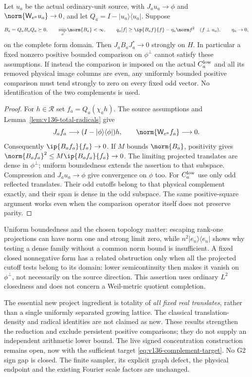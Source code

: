 \begin{proposition}
\label{prop:v136-positive-comparison}
Let $u_a$ be the actual ordinary-unit source, with $J_au_a\to\phi$
and $\norm{\mathsf W_{e^a}u_a}\to0$, and let
$Q_a=I-|u_a\rangle\langle u_a|$. Suppose
\[
 B_a=Q_aB_aQ_a\succeq0,\qquad\sup_a\norm{B_a}<\infty,
 \qquad
 q_a[f]\ge\ip{B_af}{f}-\eta_a\norm f^2\quad(f\perp u_a),
 \qquad\eta_a\to0,
\]
on the complete form domain. Then
$J_aB_aJ_a^*\to0$ strongly on $H$.
In particular a fixed nonzero positive bounded comparison on
$\phi^\perp$ cannot satisfy these assumptions.
If instead the comparison is imposed on the actual $C_a^{\rm low}$
and all its removed physical image columns are even, any uniformly
bounded positive comparison must tend strongly to zero on every
fixed odd vector. No identification of the two complements is used.
\end{proposition}
\begin{proof}
For $h\in\mathcal R$ set $f_a=Q_a(\chi_a h)$. The source assumptions
and Lemma~\ref{lem:v136-total-radicals} give
\[
 J_af_a\longrightarrow(I-|\phi\rangle\langle\phi|)h,
 \qquad\norm{\mathsf W_{e^a}f_a}\longrightarrow0.
\]
Consequently $\ip{B_af_a}{f_a}\to0$. If $M$ bounds $\norm{B_a}$,
positivity gives $\norm{B_af_a}^2\le M\ip{B_af_a}{f_a}\to0$.
The limiting projected translates are dense in $\phi^\perp$;
uniform boundedness extends the assertion to that subspace.
Compression and $J_au_a\to\phi$ give convergence on $\phi$ too.
For $C_a^{\rm low}$ use only odd reflected translates. Their odd
cutoffs belong to that physical complement exactly, and their span
is dense in the odd subspace. The same positive-square argument works
even when the comparison operator itself does not preserve parity.
\end{proof}

Uniform boundedness and the chosen topology matter: escaping rank-one
projections can have norm one and strong limit zero, while
$n^2|e_n\rangle\langle e_n|$ shows why testing a dense family without
a common norm bound is insufficient. A fixed closed nonnegative form
has a related obstruction only when all the projected cutoff tests
belong to its domain: lower semicontinuity then makes it vanish on
$\phi^\perp$, not necessarily on the source direction. This assertion
uses ordinary $L^2$ closedness and does not concern a Weil-metric
quotient completion.

The essential new project ingredient is totality of \emph{all fixed real
translates}, rather than a single uniformly separated growing lattice.
The classical translation-density and radical identities are not claimed
as new. These results strengthen the reduction and exclude persistent
positive comparisons; they do not supply an independent arithmetic
lower bound. The live signed concentration construction remains open,
now with the sufficient target \eqref{eq:v136-complement-target}.
No G2 sign gap is closed. The finite sampler, its explicit graph defect,
the physical endpoint and the existing Fourier scale factors are unchanged.
